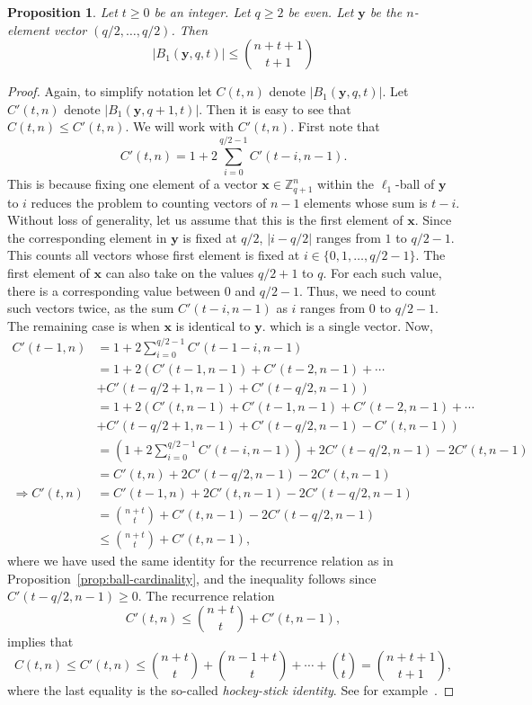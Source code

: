 \documentclass[pdflatex,sn-mathphys-num]{sn-jnl}
\newtheorem{proposition}{Proposition}
\theoremstyle{definition}
\newcommand{\vtr}[1]{\mathbf{#1}}
\begin{document}
\begin{proposition}
\label{prop:ball-contains}
Let $t \geq 0$ be an integer. Let $q \geq 2$ be even. Let $\vtr{y}$ be the $n$-element vector $(q/2, \ldots, q/2)$. Then 
\[
|B_1(\vtr{y}, q, t)| \leq \binom{n + t + 1}{t + 1}
\]
\end{proposition}
\begin{proof}
Again, to simplify notation let $C(t, n)$ denote $|B_1(\vtr{y}, q, t)|$. Let $C'(t, n)$ denote $|B_1(\vtr{y}, q + 1, t)|$. Then it is easy to see that $C(t, n) \leq C'(t, n)$. We will work with $C'(t, n)$. First note that
\[
C'(t, n) = 1 + 2 \sum_{i = 0}^{q/2 - 1} C'(t - i, n-1).
\]
This is because fixing one element of a vector $\vtr{x} \in \mathbb{Z}_{q+1}^n$ within the $\ell_1$-ball of $\vtr{y}$ to $i$ reduces the problem to counting vectors of $n-1$ elements whose sum is $t - i$.
Without loss of generality, let us assume that this is the first element of $\vtr{x}$. Since the corresponding element in $\vtr{y}$ is fixed at $q/2$, $|i - q/2|$ ranges from $1$ to $q/2 - 1$. This counts all vectors whose first element is fixed at $i \in \{0, 1, \ldots, q/2-1\}$. The first element of $\vtr{x}$ can also take on the values $q/2 + 1$ to $q$. For each such value, there is a corresponding value between $0$ and $q/2 - 1$. Thus, we need to count such vectors twice, as the sum $C'(t - i, n-1)$ as $i$ ranges from $0$ to $q/2 - 1$. The remaining case is when $\vtr{x}$ is identical to $\vtr{y}$. which is a single vector. Now,
\begin{align*}
     C'(t-1, n)  &= 1 + 2\sum_{i = 0}^{q/2-1} C'(t -1 - i, n - 1)\\
    &= 1 + 2 \left( C'(t-1, n - 1) + C'(t-2, n - 1) + \cdots\right. \\
    &+ \left. C'(t-q/2+1, n - 1) + C'(t-q/2, n - 1) \right) \\
    &= 1 + 2 \left( C'(t, n - 1) + C'(t-1, n - 1) + C'(t-2, n - 1) + \cdots \right. \\
    &+ \left. C'(t-q/2+1, n - 1) 
    + C'(t-q/2, n - 1) - C'(t, n - 1) \right)\\
      &= \left( 1 + 2 \sum_{i = 0}^{q/2 - 1} C'(t - i, n-1) \right)  + 2C'(t-q/2, n - 1) - 2C'(t, n - 1)\\
    &= C'(t, n) + 2C'(t-q/2, n - 1) - 2C'(t, n - 1) \\
\Rightarrow C'(t, n) 
&= C'(t-1, n) + 2C'(t, n-1) - 2C'(t-q/2, n-1)\\
    &= \binom{n + t}{t} + C'(t, n-1) - 2C'(t-q/2, n-1)\\
    &\leq \binom{n + t}{t} + C'(t, n-1),
\end{align*}
where we have used the same identity for the recurrence relation as in Proposition~\ref{prop:ball-cardinality}, and the inequality follows since $C'(t-q/2, n-1) \geq 0$. The recurrence relation 
\[
C'(t, n) \leq \binom{n + t}{t} + C'(t, n-1),
\]
implies that
\[
C(t, n) \leq C'(t, n) \leq \binom{n + t}{t} + \binom{n - 1 + t}{t} + \cdots + \binom{t}{t} = \binom{n + t + 1}{t + 1},
\]
where the last equality is the so-called \emph{hockey-stick identity}. See for example~\cite[\S 5]{brualdi2012combinatorics}. 
\end{proof}
\end{document}
